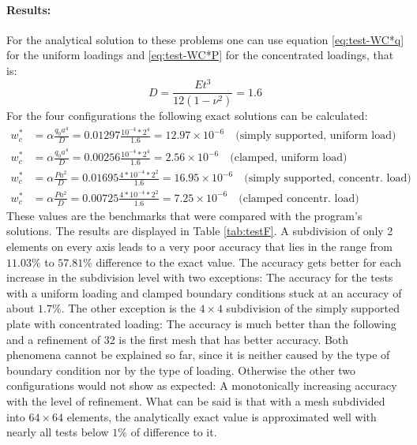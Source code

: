    \paragraph{Results:} For the analytical solution to these problems one can use equation \eqref{eq:test-WC*q} for the uniform loadings and \eqref{eq:test-WC*P} for the concentrated loadings, that is:
   \begin{equation*}
   D = \frac{E t^3}{12 \left( 1 - \nu^2 \right)} = 1.6
   \end{equation*}
   For the four configurations the following exact solutions can be calculated:
   \begin{align*}
   w_c^* &= \alpha \frac{q_0 a^4}{D} = 0.01297 \frac{10^{-4} * 2^4}{1.6} = 12.97\times 10^{-6}\quad \text{(simply supported, uniform load)}\\
   w_c^* &= \alpha \frac{q_0 a^4}{D} = 0.00256 \frac{10^{-4} * 2^4}{1.6} = 2.56\times 10^{-6}\quad \text{(clamped, uniform load)}\\
   w_c^* &= \alpha \frac{P a^2}{D} = 0.01695 \frac{4 * 10^{-4} * 2^2}{1.6} = 16.95\times 10^{-6}\quad \text{(simply supported, concentr. load)}\\
   w_c^* &= \alpha \frac{P a^2}{D} = 0.00725 \frac{4 * 10^{-4} * 2^2}{1.6} = 7.25\times 10^{-6}\quad \text{(clamped concentr. load)}
   \end{align*}
   These values are the benchmarks that were compared with the program's solutions. The results are displayed in Table \ref{tab:testF}. A subdivision of only 2 elements on every axis leads to a very poor accuracy that lies in the range from $11.03\%$ to $57.81\%$ difference to the exact value. The accuracy gets better for each increase in the subdivision level with two exceptions: The accuracy for the tests with a uniform loading and clamped boundary conditions stuck at an accuracy of about $1.7\%$. The other exception is the $4\!\times\!4$ subdivision of the simply supported plate with concentrated loading: The accuracy is much better than the following and a refinement of 32 is the first mesh that has better accuracy. Both phenomena cannot be explained so far, since it is neither caused by the type of boundary condition nor by the type of loading. Otherwise the other two configurations would not show as expected: A monotonically increasing accuracy with the level of refinement. What can be said is that with a mesh subdivided into $64\!\times\!64$ elements, the analytically exact value is approximated well with nearly all tests below $1\%$ of difference to it.
    

